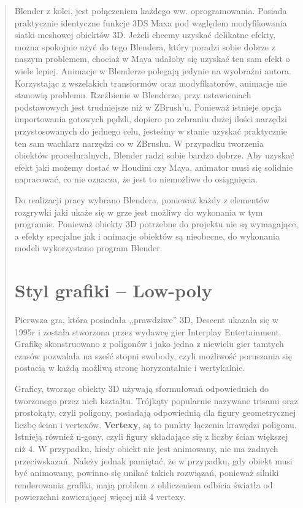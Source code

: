 \begin{quotation}
\indent Blender z kolei, jest połączeniem każdego ww. oprogramowania. Posiada praktycznie identyczne funkcje 3DS Maxa pod względem modyfikowania siatki meshowej obiektów 3D. Jeżeli chcemy uzyskać delikatne efekty, można spokojnie użyć do tego Blendera, który poradzi sobie dobrze z naszym problemem, chociaż w Maya udałoby się uzyskać ten sam efekt o wiele lepiej. Animacje w Blenderze polegają jedynie na wyobraźni autora. Korzystając z wszelakich transformów oraz modyfikatorów, animacje nie stanowią problemu. Rzeźbienie w Blenderze, przy ustawieniach podstawowych jest trudniejsze niż w ZBrush'u. Ponieważ istnieje opcja importowania gotowych pędzli, dopiero po zebraniu dużej ilości narzędzi przystosowanych do jednego celu, jesteśmy w stanie uzyskać praktycznie ten sam wachlarz narzędzi co w ZBrushu. W przypadku tworzenia obiektów proceduralnych, Blender radzi sobie bardzo dobrze. Aby uzyskać efekt jaki możemy dostać w Houdini czy Maya, animator musi się solidnie napracować, co nie oznacza, że jest to niemożliwe do osiągnięcia.

\indent Do realizacji pracy wybrano Blendera, ponieważ każdy z elementów rozgrywki jaki ukaże się w grze jest możliwy do wykonania w tym programie. Ponieważ obiekty 3D potrzebne do projektu nie są wymagające, a efekty specjalne jak i animacje obiektów są nieobecne, do wykonania modeli wykorzystano program Blender. 

\section{Styl grafiki -- Low-poly}

\indent Pierwsza gra, która posiadała ,,prawdziwe'' 3D, Descent ukazała się w 1995r i została stworzona przez wydawcę gier Interplay Entertainment. Grafikę skonstruowano z poligonów i jako jedna z niewielu gier tamtych czasów pozwalała na sześć stopni swobody, czyli możliwość poruszania się postacią w każdą możliwą stronę horyzontalnie i wertykalnie.

\indent Graficy, tworząc obiekty 3D używają sformułowań odpowiednich do tworzonego przez nich kształtu. Trójkąty popularnie nazywane trisami oraz prostokąty, czyli poligony, posiadają odpowiednią dla figury geometrycznej liczbę ścian i vertexów. \textbf{Vertexy}, są to punkty łączenia krawędzi poligonu. Istnieją również n-gony, czyli figury składające się z liczby ścian większej niż 4. W przypadku, kiedy obiekt nie jest animowany, nie ma żadnych przeciwskazań. Należy jednak pamiętać, że w przypadku, gdy obiekt musi być animowany, powinno się unikać takich rozwiązań, ponieważ silniki renderowania grafiki, mają problem z obliczeniem odbicia światła od powierzchni zawierającej więcej niż 4 vertexy.


\end{quotation}
